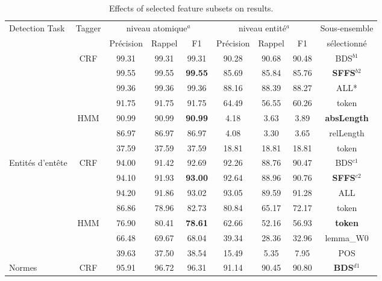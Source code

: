 \begin{table}[!h]
\scriptsize
\caption{Effects of selected feature subsets on results.}\label{fig:structuration:select-feats}
\begin{center}
\begin{tabular}{l|c|ccc|ccc|c}
\hline\noalign{\smallskip}
Detection Task & Tagger & \multicolumn{3}{c}{niveau atomique$^a$} & \multicolumn{3}{c}{niveau entité$^a$}& Sous-ensemble \\
 & & Précision & Rappel & F1 &  Précision & Rappel & F1 & sélectionné\\
\noalign{\smallskip}\hline\noalign{\smallskip}
\multirow{7}{*}{Sections} 		& \multirow{4}{*}{CRF} & 99.31 & 99.31 & 99.31 & 90.28 & 90.68 & 90.48 & BDS$^{b1}$  \\
  				&  & 99.55 & 99.55 & \textbf{99.55} & 85.69 & 85.84 & 85.76 & \textbf{SFFS}$^{b2}$ \\
                &  & 99.36 & 99.36 & 99.36 & 88.16 & 88.39 & 88.27 & ALL* \\
                &  & 91.75 & 91.75 & 91.75 & 64.49 & 56.55 & 60.26 & token \\  \cline{2-9}
                 & \multirow{3}{*}{HMM} & 90.99 & 90.99 & \textbf{90.99}  & 4.18 & 3.63 & 3.89 & \textbf{absLength} \\ 
 & & 86.97 & 86.97 & 86.97 & 4.08 & 3.30 & 3.65 & relLength \\   
  &  & 37.59 & 37.59 & 37.59  & 18.81 & 18.81 & 18.81 & token \\ \hline
\multirow{7}{*}{Entités d'entête}	& \multirow{4}{*}{CRF} & 94.00 & 91.42 & 92.69 & 92.26 & 88.76 & 90.47 & BDS$^{c1}$  \\
				&  & 94.10 & 91.93 & \textbf{93.00} & 92.64 & 88.96 & 90.76 & \textbf{SFFS}$^{c2}$  \\ 
                &  & 94.20 & 91.86 & 93.02 & 93.05 & 89.59 & 91.28 & ALL \\
                &  & 86.86 & 78.96 & 82.73 & 80.84 & 65.17 & 72.17 & token \\ \cline{2-9}
                  &  \multirow{3}{*}{HMM}  & 76.90 & 80.41 & \textbf{78.61} & 62.66 & 52.16 & 56.93 &  \textbf{token} \\ 
  &    & 66.48 & 69.67 & 68.04 & 39.34 & 28.36 & 32.96 &  lemma\_W0 \\ 
  &    & 39.63 & 37.50 & 38.54 & 15.49 & 5.35 & 7.95 &  POS \\ \hline
\multirow{6}{*}{Normes} 			& \multirow{4}{*}{CRF} & 95.91 & 96.72 & 96.31 & 91.14 & 90.45 & 90.80 & \textbf{BDS}$^{d1}$ \\ 

\end{tabular}
\end{center}
\end{table}
